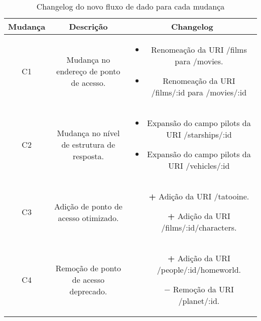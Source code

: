 \begin{table}[H]
  \centering
  \begin{tabular}{|c|c|c|}
    \hline
    Mudança & Descrição & Changelog \\
    \hline
    C1 & \begin{minipage}[t]{0.3\textwidth}
      Mudança no endereço de ponto de acesso. 
    \end{minipage} & \begin{minipage}[t]{0.5\textwidth}
      \begin{itemize}
        \item Renomeação da URI /films para /movies.
        \item Renomeação da URI /films/:id para /movies/:id
      \end{itemize}
    \end{minipage} \\
    \hline
    C2 & \begin{minipage}[t]{0.3\textwidth}
      Mudança no nível de estrutura de resposta. 
    \end{minipage} & \begin{minipage}[t]{0.5\textwidth}
      \begin{itemize}
        \item Expansão do campo pilots da URI /starships/:id
        \item Expansão do campo pilots da URI /vehicles/:id
      \end{itemize}
    \end{minipage} \\
    \hline
    C3 & \begin{minipage}[t]{0.3\textwidth}
      Adição de ponto de acesso otimizado. 
    \end{minipage} & \begin{minipage}[t]{0.5\textwidth}
      \begin{itemize}
        \item[\textbf{+}] Adição da URI /tatooine.
        \item[\textbf{+}] Adição da URI /films/:id/characters.
      \end{itemize}
    \end{minipage} \\
    \hline
    C4 & \begin{minipage}[t]{0.3\textwidth}
      Remoção de ponto de acesso deprecado. 
    \end{minipage} & \begin{minipage}[t]{0.5\textwidth}
      \begin{itemize}
        \item[\textbf{+}] Adição da URI /people/:id/homeworld.
        \item[\textbf{$-$}] Remoção da URI /planet/:id.
      \end{itemize}
    \end{minipage} \\
    \hline
  \end{tabular}
  \caption{Changelog do novo fluxo de dado para cada mudança}
\end{table}

